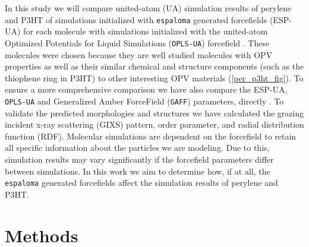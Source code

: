 \par In this study we will compare united-atom (UA) simulation results of perylene and P3HT of simulations initialized with \texttt{espaloma} generated forcefields (ESP-UA) for each molecule with simulations initialized with the united-atom Optimized Potentials for Liquid Simulations (\texttt{OPLS-UA}) forcefield \citep{opls,ghahremanpour_refinement_2022}. These molecules were chosen because they are well studied molecules with OPV properties as well as their similar chemical and structure components (such as the thiophene ring in P3HT) to other interesting OPV materials (\autoref{per_p3ht_fig}). To ensure a more comprehensive comparison we have also compare the ESP-UA, \texttt{OPLS-UA} and Generalized Amber ForceField (\texttt{GAFF}) parameters, directly \citep{gaff}. To validate the predicted morphologies and structures we have calculated the grazing incident x-ray scattering (GIXS) pattern, order parameter, and radial distribution function (RDF). Molecular simulations are dependent on the forcefield to retain all specific information about the particles we are modeling. Due to this, simulation results may vary significantly if the forcefield parameters differ between simulations. In this work we aim to determine how, if at all, the \texttt{espaloma} generated forcefields affect the simulation results of perylene and P3HT. 

\section{Methods}
